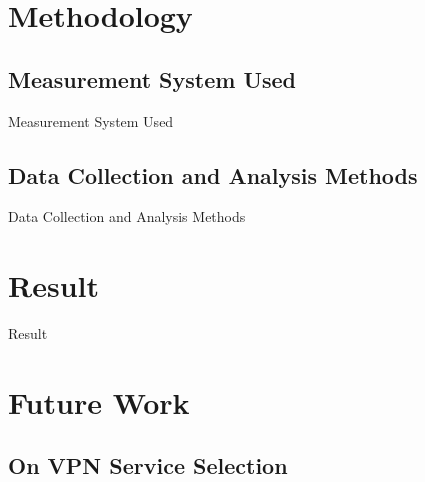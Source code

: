 \documentclass{beamer}
\begin{document}
\section{Methodology}

\subsection{Measurement System Used}

\begin{frame}{Measurement System Used}
\end{frame}

\subsection{Data Collection and Analysis Methods}

\begin{frame}{Data Collection and Analysis Methods}
\end{frame}

\section{Result}

\begin{frame}{Result}
\end{frame}

\section{Future Work}

\subsection{On VPN Service Selection}
\end{document}
